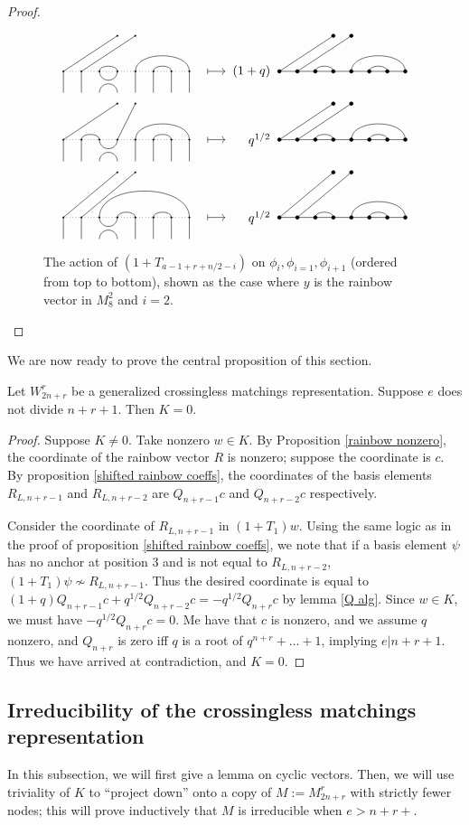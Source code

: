 \documentclass{amsart}
\begin{document}
\begin{proof}
	
	\begin{figure}
		\[
		\GeneralizedAction{8}{3/4,5/8,6/7}{2}{1/1,2/2}{1}{3}{3/4,5/8,6/7}{1/1,2/2}{(1+q)}
		\]
		\[
		\GeneralizedAction{8}{2/3,5/8,6/7}{2}{1/1,4/2}{1}{3}{3/4,5/8,6/7}{1/1,2/2}{q^{1/2}}
		\]
		\[
		\GeneralizedAction{8}{3/8,4/5,6/7}{2}{1/1,2/2}{1.25}{3}{3/4,5/8,6/7}{1/1,2/2}{q^{1/2}}
		\]
		\caption{The action of $(1+T_{a-1+r+n/2-i})$ on $\phi_i,\phi_{i=1},\phi_{i+1}$ (ordered from top to bottom), shown as the case where $y$ is the rainbow vector in $M_{8}^2$ and $i=2$.}
		\label{shifted relations}
	\end{figure}
\end{proof}	

We are now ready to prove the central proposition of this section.


\begin{proposition}
	Let $W_{2n+r}^r$ be a generalized crossingless matchings representation. Suppose $e$ does not divide $n+r+1$. Then $K=0$.
	
	\label{trivial kernel}
\end{proposition}

\begin{proof}
	Suppose $K\not=0$. Take nonzero $w\in K$. By Proposition \ref{rainbow nonzero}, the coordinate of the rainbow vector $R$ is nonzero; suppose the coordinate is $c$. By proposition \ref{shifted rainbow coeffs}, the coordinates of the basis elements $R_{L,n+r-1}$ and $R_{L,n+r-2}$ are $Q_{n+r-1}c$ and $Q_{n+r-2}c$ respectively.
	
	Consider the coordinate of $R_{L,n+r-1}$ in $(1+T_1)w$. Using the same logic as in the proof of proposition \ref{shifted rainbow coeffs}, we note that if a basis element $\psi$ has no anchor at position $3$ and is not equal to $R_{L,n+r-2}$, $(1+T_1)\psi\not\sim R_{L,n+r-1}$. Thus the desired coordinate is equal to $(1+q)Q_{n+r-1}c+q^{1/2}Q_{n+r-2}c=-q^{1/2}Q_{n+r}c$ by lemma \ref{Q alg}. Since $w\in K$, we must have $-q^{1/2}Q_{n+r}c=0$. Me have that $c$ is nonzero, and we assume $q$ nonzero, and $Q_{n+r}$ is zero iff $q$ is a root of $q^{n+r}+...+1$, implying $e|n+r+1$. Thus we have arrived at contradiction, and $K=0$.
\end{proof}

\subsection{Irreducibility of the crossingless matchings representation}
In this subsection, we will first give a lemma on cyclic vectors.
Then, we will use triviality of $K$ to ``project down'' onto a copy of $M := M_{2n + r}^r$ with strictly fewer nodes;
this will prove inductively that $M$ is irreducible when $e > n + r + $.
\end{document}
